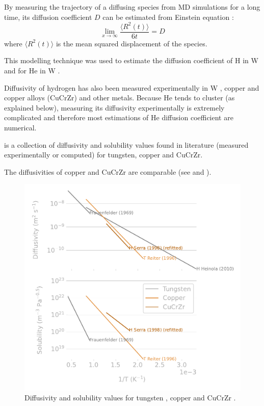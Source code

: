 By measuring the trajectory of a diffusing species from MD simulations for a long time, its diffusion coefficient $D$ can be estimated from Einstein equation \cite{einstein_uber_1905}:
\begin{equation}
    \lim_{x\to\infty} \frac{\langle R^2(t) \rangle}{6t} = D
\end{equation}
where $\langle R^2(t) \rangle$ is the mean squared displacement of the species.

This modelling technique was used to estimate the diffusion coefficient of H in W  and for He in W .

Diffusivity of hydrogen has also been measured experimentally in W , copper and copper alloys (CuCrZr)  and other metals.
Because He tends to cluster (as explained below), measuring its diffusivity experimentally is extremely complicated and therefore most estimations of He diffusion coefficient are numerical.

 is a collection of diffusivity and solubility values found in literature (measured experimentally or computed) for tungsten, copper and CuCrZr.

The diffusivities of copper and CuCrZr are comparable (see  and ).

\begin{figure}
    \centering
    \includegraphics[width=0.75\linewidth]{Figures/Chapter1/materials_properties_review_comparison.pdf}
    \caption{Diffusivity and solubility values for tungsten \cite{heinola_first-principles_2010, frauenfelder_solution_1969}, copper \cite{reiter_compilation_1996} and CuCrZr \cite{serra_hydrogen_1998}.}
\end{figure}

